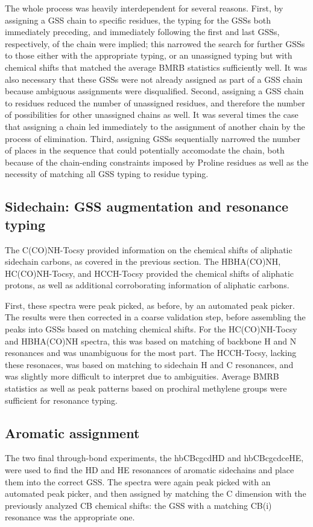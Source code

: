 The whole process was heavily interdependent for several reasons.  First, by
assigning a GSS chain to specific residues, the typing for the GSSs both
immediately preceding, and immediately following the first and last GSSs,
respectively, of the chain were implied; this narrowed the search for further
GSSs to those either with the appropriate typing, or an unassigned typing but
with chemical shifts that matched the average BMRB statistics sufficiently 
well.  It was also necessary that these GSSs were not already assigned as 
part of a GSS chain because ambiguous assignments were disqualified.
Second, assigning a GSS chain to residues reduced the number of unassigned
residues, and therefore the number of possibilities for other unassigned chains
as well.  It was several times the case that assigning a chain led immediately
to the assignment of another chain by the process of elimination.  Third,
assigning GSSs sequentially narrowed the number of places in the sequence that
could potentially accomodate the chain, both because of the chain-ending
constraints imposed by Proline residues as well as the necessity of matching
all GSS typing to residue typing.

\subsection{Sidechain: GSS augmentation and resonance typing}
The C(CO)NH-Tocsy provided information on the chemical shifts of aliphatic
sidechain carbons, as covered in the previous section.  The HBHA(CO)NH, 
HC(CO)NH-Tocsy, and HCCH-Tocsy provided the chemical shifts of aliphatic
protons, as well as additional corroborating information of aliphatic carbons.

First, these spectra were peak picked, as before, by an automated peak picker.
The results were then corrected in a coarse validation step, before assembling
the peaks into GSSs based on matching chemical shifts.  For the HC(CO)NH-Tocsy
and HBHA(CO)NH spectra, this was based on matching of backbone H and N
resonances and was unambiguous for the most part.  The HCCH-Tocsy, lacking these
resonaces, was based on matching to sidechain H and C resonances, and was
slightly more difficult to interpret due to ambiguities.  
Average BMRB statistics as well as peak patterns based on prochiral methylene
groups were sufficient for resonance typing.

\subsection{Aromatic assignment}
The two final through-bond experiments, the hbCBcgcdHD and hbCBcgcdceHE, were
used to find the HD and HE resonances of aromatic sidechains and place them
into the correct GSS.  The spectra were again peak picked with an automated
peak picker, and then assigned by matching the C dimension with the previously
analyzed CB chemical shifts: the GSS with a matching CB(i) resonance was the
appropriate one.

